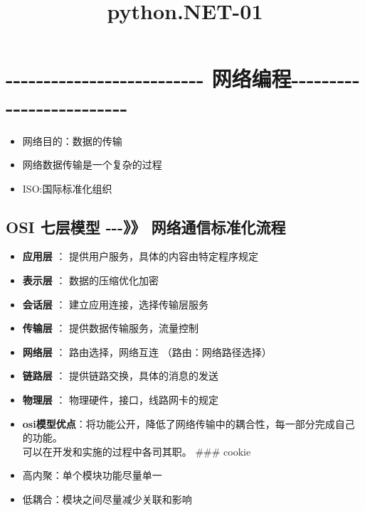 \documentclass[11pt]{article}
\title{python.NET-01}
\providecommand{\tightlist}{%
      \setlength{\itemsep}{0pt}\setlength{\parskip}{0pt}}
\begin{document}
    
    
    \maketitle
    
    

    
    \section{-\/-\/-\/-\/-\/-\/-\/-\/-\/-\/-\/-\/-\/-\/-\/-\/-\/-\/-\/-\/-\/-\/-\/-\/-\/-
网络编程-\/-\/-\/-\/-\/-\/-\/-\/-\/-\/-\/-\/-\/-\/-\/-\/-\/-\/-\/-\/-\/-\/-\/-\/-}\label{ux7f51ux7edcux7f16ux7a0b-------------------------}

\begin{itemize}
\tightlist
\item
  网络目的：数据的传输
\item
  网络数据传输是一个复杂的过程
\item
  ISO:国际标准化组织
\end{itemize}

\subsection{OSI 七层模型 -\/-\/-》》
网络通信标准化流程}\label{osi-ux4e03ux5c42ux6a21ux578b-----ux7f51ux7edcux901aux4fe1ux6807ux51c6ux5316ux6d41ux7a0b}

\begin{itemize}
\tightlist
\item
  \textbf{应用层} ： 提供用户服务，具体的内容由特定程序规定
\item
  \textbf{表示层} ： 数据的压缩优化加密
\item
  \textbf{会话层} ： 建立应用连接，选择传输层服务
\item
  \textbf{传输层} ： 提供数据传输服务，流量控制
\item
  \textbf{网络层} ： 路由选择，网络互连 （路由：网络路径选择）
\item
  \textbf{链路层} ： 提供链路交换，具体的消息的发送
\item
  \textbf{物理层} ： 物理硬件，接口，线路网卡的规定
\item
  \textbf{osi模型优点}：将功能公开，降低了网络传输中的耦合性，每一部分完成自己的功能。\\
  可以在开发和实施的过程中各司其职。 \#\#\# cookie
\item
  高内聚：单个模块功能尽量单一
\item
  低耦合：模块之间尽量减少关联和影响
\end{itemize}
\end{document}
